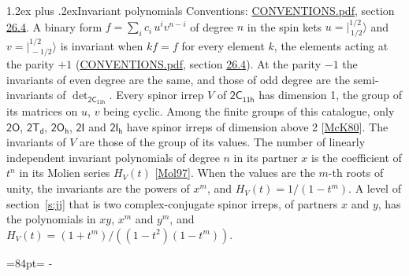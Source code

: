 \documentclass[10pt,a4paper]{article}
\makeatletter
\renewcommand\section{\@startsection{section}{1}{\z@}{-3ex plus -1ex minus -.2ex}%
  {1.2ex plus .2ex}{\normalfont\large\sffamily\bfseries\color{parttitle}}}
\newcommand{\needspace}[1]{\par\penalty-100\begingroup\dimen0=#1\relax\dimen2=\pagegoal
  \advance\dimen2-\pagetotal\ifdim\dimen0>\dimen2\relax\ifdim\dimen2>0pt\vfil\break\fi\fi
  \endgroup}
\numberwithin{equation}{section}
\newcommand{\grp}[1]{\mathsf{#1}}
\newcommand{\jm}[2]{\bigl\lvert{}^{#1}_{\,#2}\bigr\rangle}
\makeatother
\begin{document}
\section{Invariant polynomials}\label{s:invariants}
Conventions: \href{../../CONVENTIONS.pdf}{CONVENTIONS.pdf}, section \href{../../CONVENTIONS.pdf\#conv.26.4}{26.4}.
\leavevmode\label{n:local.binary.form}A binary form $f = \sum_i c_i\, u^i v^{n-i}$ of degree $n$ in the spin kets $u = \jm{1/2}{1/2}$ and $v = \jm{1/2}{-1/2}$ is invariant when $k f = f$ for every element $k$, the elements acting at the parity $+1$ (\href{../../CONVENTIONS.pdf}{CONVENTIONS.pdf}, section \href{../../CONVENTIONS.pdf\#conv.26.4}{26.4}). At the parity $-1$ the invariants of even degree are the same, and those of odd degree are the semi-invariants of $\det_{\grp{2C_{11h}}}$.
\leavevmode\label{n:function.hilbert}Every spinor irrep $V$ of $\grp{2C_{11h}}$ has dimension 1, the group of its matrices on $u$, $v$ being cyclic. Among the finite groups of this catalogue, only $\grp{2O}$, $\grp{2T_{d}}$, $\grp{2O_{h}}$, $\grp{2I}$ and $\grp{2I_{h}}$ have spinor irreps of dimension above 2 [\href{../../../REFERENCES.pdf\#ref.McK80}{McK80}]. The invariants of $V$ are those of the group of its values. \label{n:local.partner.x}The number of linearly independent invariant polynomials of degree $n$ in its partner $x$ is the coefficient of $t^n$ in its Molien series $H_V(t)$ [\href{../../../REFERENCES.pdf\#ref.Mol97}{Mol97}]. When the values are the $m$-th roots of unity, the invariants are the powers of $x^{m}$, and $H_V(t) = 1/(1 - t^{m})$. A level of section~\ref{s:jj} that is two complex-conjugate spinor irreps, of partners $x$ and $y$, has the polynomials in $xy$, $x^{m}$ and $y^{m}$, and $H_V(t) = (1 + t^{m})/((1 - t^{2})(1 - t^{m}))$.
\needspace{84pt}
\end{document}
